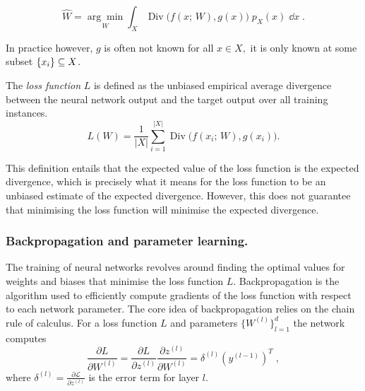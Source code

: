             \begin{equation}
                \widehat{W} = \underset{W}{\arg\min}\int_X \operatorname{Div}\Big(f(x;\,W), g(x)\Big)\;p_X(x)\;\dd x\;.
            \end{equation}

            In practice however, \(g\) is often not known for all \(x\in X,\) it is only known at some subset \(\qty{x_i}\subseteq X\).
            
            \begin{definition}
                The \emph{loss function} \(L\) is defined as the unbiased empirical average divergence between the neural network output and the target output over all training instances.
            \begin{equation}
                L(W) = \frac{1}{|X|}\sum_{i=1}^{|X|}\operatorname{Div}\Big(f(x_i;\,W), g(x_i)\Big).
            \end{equation}
            \end{definition}

            This definition entails that the expected value of the loss function is the expected divergence, which is precisely what it means for the loss function to be an unbiased estimate of the expected divergence.
            However, this does not guarantee that minimising the loss function will minimise the expected divergence.
        \subsubsection{Backpropagation and parameter learning.}
            The training of neural networks revolves around finding the optimal values for weights and biases that minimise the loss function \(L\).
            Backpropagation is the algorithm used to efficiently compute gradients of the loss function with respect to each network parameter.
            The core idea of backpropagation relies on the chain rule of calculus.
            For a loss function \(L\) and parameters \(\{W^{(l)}\}_{l=1}^d\) the network computes
            \begin{equation}
            \frac{\partial L}{\partial W^{(l)}} = \frac{\partial L}{\partial z^{(l)}} \frac{\partial z^{(l)}}{\partial W^{(l)}} = \delta^{(l)} (y^{(l-1)})^T \;,
            \end{equation}
            where \(\delta^{(l)} = \frac{\partial \mathcal{L}}{\partial z^{(l)}}\) is the error term for layer \(l\).
            

